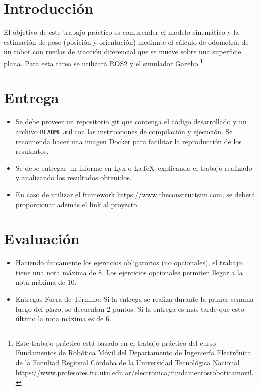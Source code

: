 \documentclass[tp]{lcc}
\begin{document}
\maketitle


\section{Introducción}

El objetivo de este trabajo práctico es comprender el modelo cinemático y la estimación de pose (posición y orientación) mediante el cálculo de odometría de un robot con ruedas de tracción diferencial que se mueve sobre una superficie plana. Para esta tarea se utilizará ROS2 y el simulador Gazebo.\footnote{Este trabajo práctico está basado en el trabajo práctico del curso Fundamentos de Robótica Móvil del Departamento de Ingeniería Electrónica de la Facultad Regional Córdoba de la Universidad Tecnológica Nacional \url{https://www.profesores.frc.utn.edu.ar/electronica/fundamentosroboticamovil}.}


\section{Entrega}
\begin{itemize}
    \item Se debe proveer un repositorio git que contenga el código desarrollado y un archivo \lstinline{README.md} con las instrucciones de compilación y ejecución. Se recomienda hacer una imagen Docker para facilitar la reproducción de los resuldatos.

    \item Se debe entregar un informe en Lyx o \LaTeX\  explicando el trabajo realizado y analizando los resultados obtenidos.
    
    \item En caso de utilizar el framework \url{https://www.theconstructsim.com}, se deberá proporcionar además el link al proyecto.
\end{itemize}

\section{Evaluación}
\begin{itemize}
    \item Haciendo únicamente los ejercicios obligarorios (no opcionales), el trabajo tiene una nota máxima de 8. Los ejercicios opcionales permiten llegar a la nota máxima de 10.
    \item Entregas Fuera de Término: Si la entrega se realiza durante la primer semana luego del plazo, se decuentan 2 puntos. Si la entrega es más tarde que esto último la nota máxima es de 6.
\end{itemize}
\end{document}
